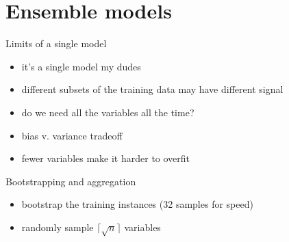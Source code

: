 \documentclass[12pt, smalloffset, compress, aspectratio=1610]{beamer}
\providecommand{\tightlist}{%
  \setlength{\itemsep}{0pt}\setlength{\parskip}{0pt}}
\begin{document}
\section{Ensemble models}\label{ensemble-models}

\begin{frame}{Limits of a single model}
\label{limits-of-a-single-model}
\begin{itemize}
\tightlist
\item
  it's a single model my dudes
\item
  different subsets of the training data may have different signal
\item
  do we need all the variables all the time?
\item
  bias v. variance tradeoff
\item
  fewer variables make it harder to overfit
\end{itemize}
\end{frame}

\begin{frame}{Bootstrapping and aggregation}
\label{bootstrapping-and-aggregation}
\begin{itemize}
\tightlist
\item
  bootstrap the training \alert{instances} (32 samples for speed)
\item
  randomly sample \(\lceil \sqrt{n} \rceil\) variables
\end{itemize}
\end{frame}
\end{document}

